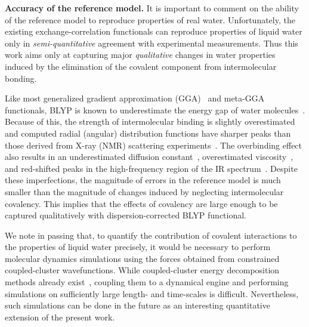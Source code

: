 \documentclass[journal=jacsat,manuscript=article]{achemso}
\begin{document}
\textbf{Accuracy of the reference model.} It is important to comment on the ability of the reference model to reproduce properties of real water. 
Unfortunately, the existing exchange-correlation functionals can reproduce properties of liquid water only in \emph{semi-quantitative} agreement with experimental measurements. 
Thus this work aims only at capturing major \emph{qualitative} changes in water properties induced by the elimination of the covalent component from intermolecular bonding. 

Like most generalized gradient approximation (GGA)~\cite{cheng2012alignment} and meta-GGA~\cite{chen2017ab} functionals, BLYP is known to underestimate the energy gap of water molecules~\cite{adriaanse2012aqueous}.
Because of this, the strength of intermolecular binding is slightly overestimated and computed radial (angular) distribution functions have sharper peaks than those derived from X-ray (NMR) scattering experiments~\cite{gillan2016perspective, ma2012ab}.
The overbinding effect also results in an underestimated diffusion constant~\cite{bankura2014structure}, overestimated viscosity~\cite{khaliullin2013microscopic}, and red-shifted peaks in the high-frequency region of the IR spectrum~\cite{lee2007dynamical}. 
Despite these imperfections, the magnitude of errors in the reference model is much smaller than the magnitude of changes induced by neglecting intermolecular covalency. 
This implies that the effects of covalency are large enough to be captured qualitatively with dispersion-corrected BLYP functional. 

We note in passing that, to quantify the contribution of covalent interactions to the properties of liquid water precisely, it would be necessary to perform molecular dynamics simulations using the forces obtained from constrained coupled-cluster wavefunctions. While coupled-cluster energy decomposition methods already exist~\cite{schneider2016decomposition,azar2012energy,azar2015similarity}, coupling them to a dynamical engine and performing simulations on sufficiently large length- and time-scales is difficult. Nevertheless, such simulations can be done in the future as an interesting quantitative extension of the present work.
\end{document}
